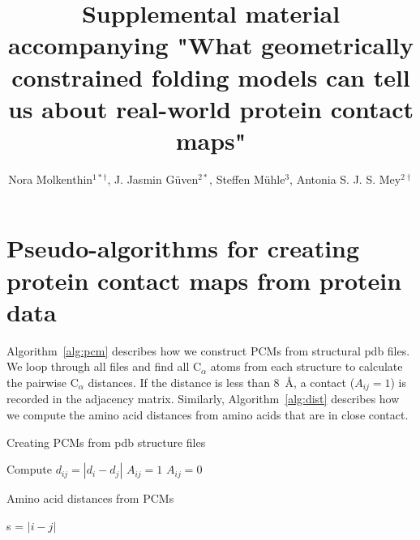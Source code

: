 \documentclass[10pt]{iopart}
\begin{document}
\title[Supplementary material]{Supplemental material accompanying "What geometrically constrained folding models can tell us about real-world protein contact maps"}
\author{Nora Molkenthin$^{1*\dagger}$, J. Jasmin Güven$^{2*}$, Steffen Mühle$^{3}$, Antonia S. J. S. Mey$^{2\dagger}$}
\address{$^1$Potsdam Institute for Climate Impact Research, Germany}
\address{$^2$EaStCHEM School of Chemistry, University of Edinburgh, Edinburgh, United Kingdom}
\address{$^3$Max-Planck Institute for Dynamics and Self-Organization (MPIDS), Am Faßberg 17, 37077 Göttingen, Germany}
\address{$^*$ These authors contributed equally}
\address{$^\dagger$ To whom correspondence should be addressed}



\section{Pseudo-algorithms for creating protein contact maps from protein data}

Algorithm~\ref{alg:pcm} describes how we construct PCMs from structural pdb files. We loop through all files and find all C$_\alpha$ atoms from each structure to calculate the pairwise C$_\alpha$ distances. If the distance is less than 8~Å, a contact ($A_{ij}=1$) is recorded in the adjacency matrix. Similarly, Algorithm~\ref{alg:dist} describes how we compute the amino acid distances from amino acids that are in close contact.
 
\begin{algorithm}[htb]
\caption{Creating PCMs from pdb structure files}\label{alg:pcm}
\begin{algorithmic}[1]
\State Compute $d_{ij}=|d_i-d_j|$ 
    \State \texttt{$A_{ij}=1$} 
\Else
    \State \texttt{$A_{ij}=0$} 
\EndIf
\EndFor
\EndFor
\end{algorithmic}
\end{algorithm}

\begin{algorithm}[htb]
\caption{Amino acid distances from PCMs}\label{alg:dist}
\begin{algorithmic}[1]
 
    \State s = $|i - j|$
\EndIf
\EndFor
\EndFor
\end{algorithmic}
\end{algorithm}
\end{document}
